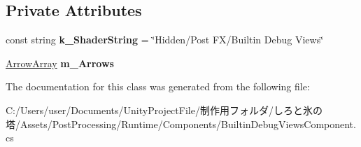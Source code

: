 \subsection*{Private Attributes}
\begin{DoxyCompactItemize}
\item 
\mbox{\label{class_unity_engine_1_1_post_processing_1_1_builtin_debug_views_component_a45c39a3d538b09a9d37d4cbac0050755}} 
const string {\bfseries k\+\_\+\+Shader\+String} = \char`\"{}Hidden/Post FX/Builtin Debug Views\char`\"{}
\item 
\mbox{\label{class_unity_engine_1_1_post_processing_1_1_builtin_debug_views_component_a95ea11d2fe39f7a587f1b5f1b2336539}} 
\hyperlink{class_unity_engine_1_1_post_processing_1_1_builtin_debug_views_component_1_1_arrow_array}{Arrow\+Array} {\bfseries m\+\_\+\+Arrows}
\end{DoxyCompactItemize}


The documentation for this class was generated from the following file\+:\begin{DoxyCompactItemize}
\item 
C\+:/\+Users/user/\+Documents/\+Unity\+Project\+File/制作用フォルダ/しろと氷の塔/\+Assets/\+Post\+Processing/\+Runtime/\+Components/Builtin\+Debug\+Views\+Component.\+cs\end{DoxyCompactItemize}
